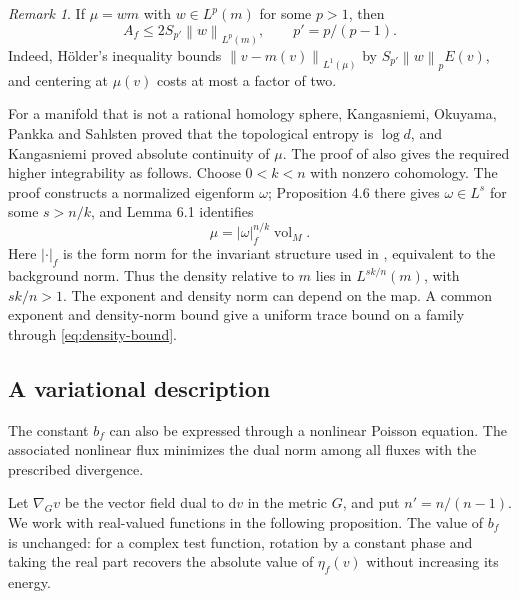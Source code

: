 \documentclass[11pt,reqno]{amsart}
\theoremstyle{plain}
\theoremstyle{definition}
\theoremstyle{remark}
\newtheorem{remark}[theorem]{Remark}
\newcommand{\norm}[1]{\left\lVert #1\right\rVert}
\newcommand{\dd}{\mathrm d}
\DeclareMathOperator{\vol}{vol}
\numberwithin{equation}{section}
\begin{document}
\begin{remark}\label{rem:density}
If $\mu=w m$ with $w\in L^p(m)$ for some $p>1$, then
\begin{equation}\label{eq:density-bound}
 A_f\le2S_{p'}\norm{w}_{L^p(m)},\qquad p'=p/(p-1).
\end{equation}
Indeed, H\"older's inequality bounds $\norm{v-m(v)}_{L^1(\mu)}$ by $S_{p'}\norm{w}_pE(v)$, and centering at $\mu(v)$ costs at most a factor of two.

For a manifold that is not a rational homology sphere, Kangasniemi, Okuyama, Pankka and Sahlsten \cite{KOPS21} proved that the topological entropy is $\log d$, and Kangasniemi \cite{Kan21} proved absolute continuity of $\mu$. The proof of \cite[Theorem 1.2]{Kan21} also gives the required higher integrability as follows. Choose $0<k<n$ with nonzero cohomology. The proof constructs a normalized eigenform $\omega$; Proposition 4.6 there gives $\omega\in L^s$ for some $s>n/k$, and Lemma 6.1 identifies
\[
 \mu=|\omega|_f^{n/k}\vol_M.
\]
Here $|\cdot|_f$ is the form norm for the invariant structure used in \cite{Kan21}, equivalent to the background norm. Thus the density relative to $m$ lies in $L^{sk/n}(m)$, with $sk/n>1$. The exponent and density norm can depend on the map. A common exponent and density-norm bound give a uniform trace bound on a family through \eqref{eq:density-bound}.
\end{remark}

\subsection{A variational description}

The constant $b_f$ can also be expressed through a nonlinear Poisson equation. The associated nonlinear flux minimizes the dual norm among all fluxes with the prescribed divergence.

Let $\nabla_Gv$ be the vector field dual to $\dd v$ in the metric $G$, and put $n'=n/(n-1)$. We work with real-valued functions in the following proposition. The value of $b_f$ is unchanged: for a complex test function, rotation by a constant phase and taking the real part recovers the absolute value of $\eta_f(v)$ without increasing its energy.
\end{document}
